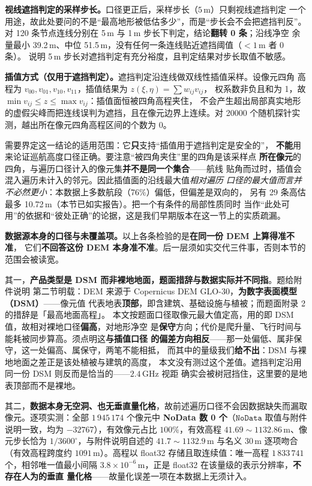 \textbf{视线遮挡判定的采样步长。}口径更正后，采样步长（$5$\,m）只剩视线遮挡判定
一个用途，故此处要问的不是“最高地形被低估多少”，而是“步长会不会把遮挡判反”。
对 120 条节点连线分别在 5\,m 与 1\,m 步长下判定，结论\textbf{翻转 0 条}；沿线净空
余量最小 39.2\,m、中位 51.5\,m，没有任何一条连线贴近遮挡阈值（$<1$\,m 者 0 条）。
说明 5\,m 步长对遮挡判定有充分裕度，且判定结果对步长取值不敏感。

\textbf{插值方式（仅用于遮挡判定）。}遮挡判定沿连线做双线性插值采样。设像元四角
高程为 $v_{00},v_{01},v_{10},v_{11}$，插值结果为 $z(\xi,\eta)=\sum w_{ij}v_{ij}$，
权系数非负且和为 1，故 $\min v_{ij}\le z\le\max v_{ij}$：插值面恒被四角高程夹住，
不会产生超出局部真实地形的虚假尖峰而把连线误判为遮挡，且在像元边界上连续。对
20000 个随机探针实测，越出所在像元四角高程区间的个数为 0。

需要界定这一结论的适用范围：它\textbf{只}支持“插值用于遮挡判定是安全的”，
\textbf{不能}用来论证巡航高度口径正确。要注意“被四角夹住”里的四角是该采样点
\textbf{所在像元}的四角，与遍历口径计入的像元集\textbf{并不是同一个集合}——航线
贴角而过时，插值会混入遍历未计入的邻元。因此插值面的沿线最大值\emph{相对遍历
口径的最大值而言并不必然更小}：本数据上多数航段（76\%）偏低，但偏差是双向的，
另有 29 条高估最多 10.72\,m（本节已如实报告）。把一个有条件的局部性质同时
当作“此处可用”的依据和“彼处正确”的论据，这是我们早期版本在这一节上的实质疏漏。

\textbf{数据源本身的口径与未覆盖项。}以上各条检验的是\textbf{在同一份 DEM 上算得准不准}，
它们\textbf{不回答这份 DEM 本身准不准}。后一层须如实交代三件事，否则本节的范围会被读宽。

其一，\textbf{产品类型是 DSM 而非裸地地面，题面措辞与数据实际并不同指}。题给附件说明
第二节明载：DEM 来源于 Copernicus DEM GLO-30，\textbf{为数字表面模型（DSM）}——像元值
代表地表\textbf{顶部}，即含建筑、基础设施与植被；而题面附录 2 的措辞是「最高地面高程」。
本文按题面口径取像元最大值定高，用的即 DSM 值，故相对裸地口径\textbf{偏高}，对地形净空
是\textbf{保守}方向；代价是爬升量、飞行时间与能耗被同步算高。须点明这\textbf{与插值口径
的偏差方向相反}——那一处偏低、属非保守，这一处偏高、属保守，两笔不能相抵，
而其中的量级我们\textbf{给不出}：DSM 与裸地地面之差正是该处植被与建筑的高度，
本文没有测过这个差值。遮挡判定沿用同一份 DSM 则反而是恰当的——$2.4$\,GHz 视距
确实会被树冠挡住，这里要的是地表顶部而不是裸地。

其二，\textbf{数据本身无空洞、也无垂直量化格}，故前述遍历口径不会因数据缺失而漏取
像元。逐项实测：全部 $1\,945\,174$ 个像元中 \textbf{NoData 数 0 个}（$\mathtt{NoData}$
取值与附件说明一致，均为 $-32767$），有效像元占比 $100\%$，有效高程
$41.69\sim1132.86$\,m、像元步长恰为 $1/3600^\circ$，与附件说明自述的
$41.7\sim1132.9$\,m 与名义 $30$\,m 逐项吻合（有效高程跨度约 $1091$\,m）。高程以
float32 存储且取连续值：唯一高程 $1\,833\,741$ 个，相邻唯一值最小间隔
$3.8\times10^{-6}$\,m，正是 float32 在该量级的表示分辨率，\textbf{不存在人为的垂直
量化格}——故量化误差一项在本数据上无须计入。

